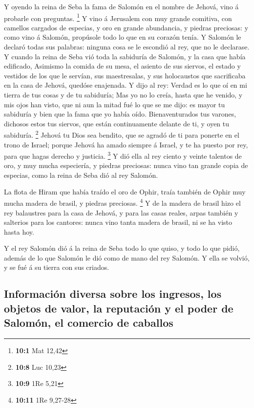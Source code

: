  Y oyendo la reina de Seba la fama de Salomón en el nombre
de Jehová, vino á probarle con preguntas. \footnote{\textbf{10:1} Mat
  12,42}  Y vino á Jerusalem con muy grande comitiva, con
camellos cargados de especias, y oro en grande abundancia, y piedras
preciosas: y como vino á Salomón, propúsole todo lo que en su corazón
tenía.  Y Salomón le declaró todas sus palabras: ninguna
cosa se le escondió al rey, que no le declarase.  Y cuando
la reina de Seba vió toda la sabiduría de Salomón, y la casa que había
edificado,  Asimismo la comida de su mesa, el asiento de
sus siervos, el estado y vestidos de los que le servían, sus
maestresalas, y sus holocaustos que sacrificaba en la casa de Jehová,
quedóse enajenada.  Y dijo al rey: Verdad es lo que oí en
mi tierra de tus cosas y de tu sabiduría;  Mas yo no lo
creía, hasta que he venido, y mis ojos han visto, que ni aun la mitad
fué lo que se me dijo: es mayor tu sabiduría y bien que la fama que yo
había oído.  Bienaventurados tus varones, dichosos estos
tus siervos, que están continuamente delante de ti, y oyen tu sabiduría.
\footnote{\textbf{10:8} Luc 10,23}  Jehová tu Dios sea
bendito, que se agradó de ti para ponerte en el trono de Israel; porque
Jehová ha amado siempre á Israel, y te ha puesto por rey, para que hagas
derecho y justicia. \footnote{\textbf{10:9} 1Re 5,21}  Y
dió ella al rey ciento y veinte talentos de oro, y muy mucha especiería,
y piedras preciosas: nunca vino tan grande copia de especias, como la
reina de Seba dió al rey Salomón.

 La flota de Hiram que había traído el oro de Ophir,
traía también de Ophir muy mucha madera de brasil, y piedras preciosas.
\footnote{\textbf{10:11} 1Re 9,27-28}  Y de la madera de
brasil hizo el rey balaustres para la casa de Jehová, y para las casas
reales, arpas también y salterios para los cantores: nunca vino tanta
madera de brasil, ni se ha visto hasta hoy.

 Y el rey Salomón dió á la reina de Seba todo lo que
quiso, y todo lo que pidió, además de lo que Salomón le dió como de mano
del rey Salomón. Y ella se volvió, y se fué á su tierra con sus criados.

\hypertarget{informaciuxf3n-diversa-sobre-los-ingresos-los-objetos-de-valor-la-reputaciuxf3n-y-el-poder-de-salomuxf3n-el-comercio-de-caballos}{%
\subsection{Información diversa sobre los ingresos, los objetos de
valor, la reputación y el poder de Salomón, el comercio de
caballos}\label{informaciuxf3n-diversa-sobre-los-ingresos-los-objetos-de-valor-la-reputaciuxf3n-y-el-poder-de-salomuxf3n-el-comercio-de-caballos}}

